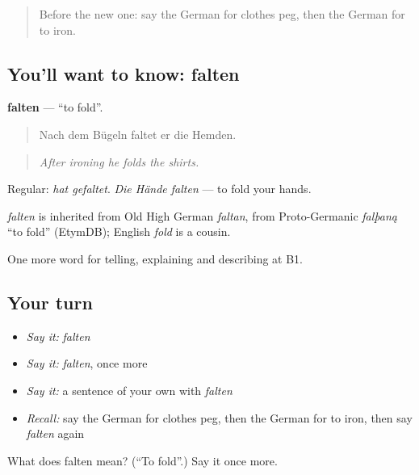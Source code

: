 \label{lesson:GE-C527-falten}



\begin{quote}
Before the new one: say the German for clothes peg, then the German for to iron.
\end{quote}

\subsection*{You'll want to know: falten}
\textbf{falten} — \textquotedblleft{}to fold\textquotedblright{}.

\begin{quote}
Nach dem Bügeln faltet er die Hemden.
\end{quote}

\begin{quote}
\emph{After ironing he folds the shirts.}
\end{quote}

Regular: \emph{hat gefaltet}. \emph{Die Hände falten} — to fold your hands.

\begin{cousinweb}
\emph{falten} is inherited from Old High German \emph{faltan}, from Proto-Germanic \emph{falþaną} \textquotedblleft{}to fold\textquotedblright{} (EtymDB); English \emph{fold} is a cousin.
\end{cousinweb}

\begin{grammarlens}[title={What you've built}]
One more word for telling, explaining and describing at B1.
\end{grammarlens}

\subsection*{Your turn}
\begin{itemize}
\raggedright
  \item \emph{Say it:} \emph{falten}
  \item \emph{Say it:} \emph{falten}, once more
  \item \emph{Say it:} a sentence of your own with \emph{falten}
  \item \emph{Recall:} say the German for clothes peg, then the German for to iron, then say \emph{falten} again
\end{itemize}

\begin{tcolorbox}[breakable,colback=teal!4,colframe=teal!35!black,title={Before you move on}]
What does falten mean? (\textquotedblleft{}To fold\textquotedblright{}.) Say it once more.
\end{tcolorbox}
